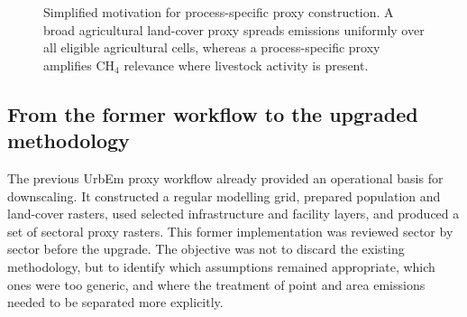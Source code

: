 \begin{figure}[htbp]
  \caption{Simplified motivation for process-specific proxy construction.
    A broad agricultural land-cover proxy spreads emissions uniformly over
    all eligible agricultural cells, whereas a process-specific proxy
    amplifies CH$_4$ relevance where livestock activity is present.}
  \label{fig:proxy-process-motivation}
\end{figure}





\subsection{From the former workflow to the upgraded methodology}

The previous UrbEm proxy workflow already provided an operational basis
for downscaling. It constructed a regular modelling grid, prepared
population and land-cover rasters, used selected infrastructure and
facility layers, and produced a set of sectoral proxy rasters. This
former implementation was reviewed sector by sector before the upgrade.
The objective was not to discard the existing methodology, but to
identify which assumptions remained appropriate, which ones were too
generic, and where the treatment of point and area emissions needed to
be separated more explicitly.


